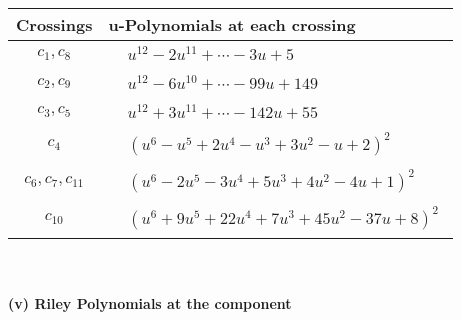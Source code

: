 \documentclass[1p]{elsarticle_modified}
\theoremstyle{definition}
\begin{document}
\begin{tabular}{m{50pt}|m{274pt}}
Crossings & \hspace{64pt}u-Polynomials at each crossing \\
\hline $$\begin{aligned}c_{1},c_{8}\end{aligned}$$&$\begin{aligned}
&u^{12}-2 u^{11}+\cdots-3 u+5
\end{aligned}$\\
\hline $$\begin{aligned}c_{2},c_{9}\end{aligned}$$&$\begin{aligned}
&u^{12}-6 u^{10}+\cdots-99 u+149
\end{aligned}$\\
\hline $$\begin{aligned}c_{3},c_{5}\end{aligned}$$&$\begin{aligned}
&u^{12}+3 u^{11}+\cdots-142 u+55
\end{aligned}$\\
\hline $$\begin{aligned}c_{4}\end{aligned}$$&$\begin{aligned}
&(u^6- u^5+2 u^4- u^3+3 u^2- u+2)^2
\end{aligned}$\\
\hline $$\begin{aligned}c_{6},c_{7},c_{11}\end{aligned}$$&$\begin{aligned}
&(u^6-2 u^5-3 u^4+5 u^3+4 u^2-4 u+1)^2
\end{aligned}$\\
\hline $$\begin{aligned}c_{10}\end{aligned}$$&$\begin{aligned}
&(u^6+9 u^5+22 u^4+7 u^3+45 u^2-37 u+8)^2
\end{aligned}$\\
\hline
\end{tabular}\\~\\
\newpage\renewcommand{\arraystretch}{1}
\flushleft \textbf{(v) Riley Polynomials at the component}\newline \\
\end{document}
